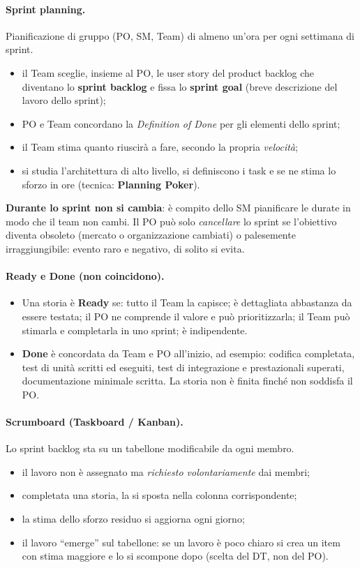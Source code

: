 \documentclass[a4paper,12pt]{article}
\begin{document}
\paragraph{Sprint planning.} Pianificazione di gruppo (PO, SM, Team) di almeno un'ora per
ogni settimana di sprint.
\begin{itemize}
  \item il Team sceglie, insieme al PO, le user story del product backlog che
        diventano lo \textbf{sprint backlog} e fissa lo \textbf{sprint goal} (breve
        descrizione del lavoro dello sprint);
  \item PO e Team concordano la \emph{Definition of Done} per gli elementi dello sprint;
  \item il Team stima quanto riuscirà a fare, secondo la propria \emph{velocità};
  \item si studia l'architettura di alto livello, si definiscono i task e se ne stima lo
        sforzo in ore (tecnica: \textbf{Planning Poker}).
\end{itemize}
\textbf{Durante lo sprint non si cambia}: è compito dello SM pianificare le durate in
modo che il team non cambi. Il PO può solo \emph{cancellare} lo sprint se l'obiettivo
diventa obsoleto (mercato o organizzazione cambiati) o palesemente irraggiungibile:
evento raro e negativo, di solito si evita.

\paragraph{Ready e Done (non coincidono).}
\begin{itemize}
  \item Una storia è \textbf{Ready} se: tutto il Team la capisce; è dettagliata abbastanza
        da essere testata; il PO ne comprende il valore e può prioritizzarla; il Team può
        stimarla e completarla in uno sprint; è indipendente.
  \item \textbf{Done} è concordata da Team e PO all'inizio, ad esempio: codifica
        completata, test di unità scritti ed eseguiti, test di integrazione e
        prestazionali superati, documentazione minimale scritta. La storia non è finita
        finché non soddisfa il PO.
\end{itemize}

\paragraph{Scrumboard (Taskboard / Kanban).} Lo sprint backlog sta su un tabellone
modificabile da ogni membro.
\begin{itemize}
  \item il lavoro non è assegnato ma \emph{richiesto volontariamente} dai membri;
  \item completata una storia, la si sposta nella colonna corrispondente;
  \item la stima dello sforzo residuo si aggiorna ogni giorno;
  \item il lavoro ``emerge'' sul tabellone: se un lavoro è poco chiaro si crea un item con
        stima maggiore e lo si scompone dopo (scelta del DT, non del PO).
\end{itemize}
\end{document}
